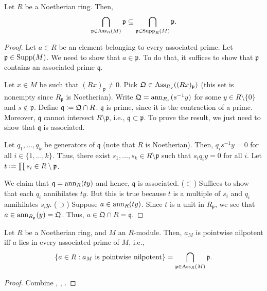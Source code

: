 \begin{prop} \label{prop:every-support-prime-every-associated-prime}
	Let $R$ be a Noetherian ring. Then,
	\begin{equation*} 
		\bigcap_{\mathfrak{p} \in \operatorname{Ass}_{R}(M)} \mathfrak{p} \subseteq \bigcap_{\mathfrak{p} \in \operatorname{Supp}_{R}(M)} \mathfrak{p}.
	\end{equation*}
\end{prop}
\begin{proof} 
	Let $a \in R$ be an element belonging to every associated prime. Let $\mathfrak{p} \in \operatorname{Supp}(M)$. We need to show that $a \in \mathfrak{p}$. To do that, it suffices to show that $\mathfrak{p}$ contains an associated prime $\mathfrak{q}$.

	Let $x \in M$ be such that $(Rx)_{\mathfrak{p}} \neq 0$. Pick $\mathfrak{Q} \in \operatorname{Ass}_{R_{\mathfrak{p}}}((Rx)_{\mathfrak{p}})$ (this set is nonempty since $R_{\mathfrak{p}}$ is Noetherian). Write $\mathfrak{Q} = \operatorname{ann}_{R_{\mathfrak{p}}}(s^{-1} y)$ for some $y \in R \setminus \{0\}$ and $s \notin \mathfrak{p}$. \newline
	Define $\mathfrak{q} \vcentcolon= \mathfrak{Q} \cap R$. $\mathfrak{q}$ is prime, since it is the contraction of a prime. Moreover, $\mathfrak{q}$ cannot intersect $R \setminus \mathfrak{p}$, i.e., $\mathfrak{q} \subset \mathfrak{p}$. To prove the result, we just need to show that $\mathfrak{q}$ is associated. 

	Let $q_{1}, \ldots, q_{k}$ be generators of $\mathfrak{q}$ (note that $R$ is Noetherian). Then, $q_{i} s^{-1} y = 0$ for all $i \in \{1, \ldots, k\}$. Thus, there exist $s_{1}, \ldots, s_{k} \in R \setminus \mathfrak{p}$ such that $s_{i} q_{i} y = 0$ for all $i$. Let $t \vcentcolon= \prod s_{i} \in R \setminus \mathfrak{p}$. 

	We claim that $\mathfrak{q} = \operatorname{ann}_{R}(ty)$ and hence, $\mathfrak{q}$ is associated. \newline
	($\subset$) Suffices to show that each $q_{i}$ annihilates $ty$. But this is true because $t$ is a multiple of $s_{i}$ and $q_{i}$ annihilates $s_{i} y$. \newline
	($\supset$) Suppose $a \in \operatorname{ann}_{R}(ty)$. Since $t$ is a unit in $R_{\mathfrak{p}}$, we see that $a \in \operatorname{ann}_{R_{\mathfrak{p}}}(y) = \mathfrak{Q}$. Thus, $a \in \mathfrak{Q} \cap R = \mathfrak{q}$.
\end{proof}

\begin{cor} \label{cor:noetherian-pointwise-nilpotent-iff-every-associated-prime}
	Let $R$ be a Noetherian ring, and $M$ an $R$-module. Then, $a_{M}$ is pointwise nilpotent iff $a$ lies in every associated prime of $M$, i.e.,
	\begin{equation*} 
		\{a \in R : a_{M} \text{ is pointwise nilpotent}\} = \bigcap_{\mathfrak{p} \in \operatorname{Ass}_{R}(M)} \mathfrak{p}.
	\end{equation*}
\end{cor}
\begin{proof} 
	Combine , , .
\end{proof}


